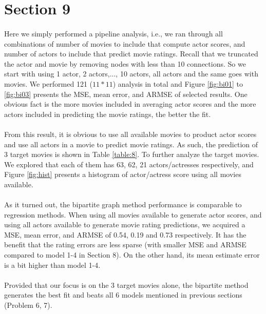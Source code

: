 \section*{Section 9}
\paragraph{}
Here we simply performed a pipeline analysis, i.e., we ran through all combinations of number of movies to include that compute actor scores, and number of actors to include that predict movie ratings. Recall that we truncated the actor and movie by removing nodes with less than 10 connections. So we start with using 1 actor, 2 actors,..., 10 actors, all actors and the same goes with movies. We performed 121 ($11*11$) analysis in total and Figure \ref{fig:bi01} to \ref{fig:bi03} presents the MSE, mean error, and ARMSE of selected results. One obvious fact is the more movies included in averaging actor scores and the more actors included in predicting the movie ratings, the better the fit.
\paragraph{}
From this result, it is obvious to use all available movies to product actor scores and use all actors in a movie to predict movie ratings. As such, the prediction of 3 target movies is shown in Table \ref{table:8}. To further analyze the target movies. We explored that each of them has 63, 62, 21 actors/actresses respectively, and Figure \ref{fig:hist} presents a histogram of actor/actress score using all movies available.
\paragraph{}
As it turned out, the bipartite graph method performance is comparable to regression methods. When using all movies available to generate actor scores, and using all actors available to generate movie rating predictions, we acquired a MSE, mean error, and ARMSE of 0.54, 0.19 and 0.73 respectively. It has the benefit that the rating errors are less sparse (with smaller MSE and ARMSE compared to model 1-4 in Section 8). On the other hand, its mean estimate error is a bit higher than model 1-4.
\paragraph{}
Provided that our focus is on the 3 target movies alone, the bipartite method generates the best fit and beats all 6  models mentioned in previous sections (Problem 6, 7).

